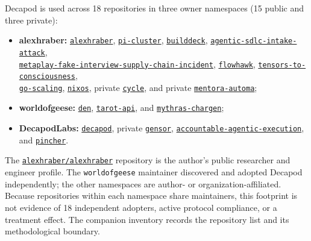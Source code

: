 Decapod is used across 18 repositories in three owner namespaces (15 public and three private):
\begin{sloppypar}
\begin{itemize}
    \item \textbf{alexhraber:} \href{https://github.com/alexhraber/alexhraber}{\nolinkurl{alexhraber}}, \href{https://github.com/alexhraber/pi-cluster}{\nolinkurl{pi-cluster}}, \href{https://github.com/alexhraber/builddeck}{\nolinkurl{builddeck}}, \href{https://github.com/alexhraber/agentic-sdlc-intake-attack}{\nolinkurl{agentic-sdlc-intake-attack}},\\
    \href{https://github.com/alexhraber/metaplay-fake-interview-supply-chain-incident}{\nolinkurl{metaplay-fake-interview-supply-chain-incident}}, \href{https://github.com/alexhraber/flowhawk}{\nolinkurl{flowhawk}}, \href{https://github.com/alexhraber/tensors-to-consciousness}{\nolinkurl{tensors-to-consciousness}},\\
    \href{https://github.com/alexhraber/go-scaling}{\nolinkurl{go-scaling}}, \href{https://github.com/alexhraber/nixos}{\nolinkurl{nixos}}, private \href{https://github.com/alexhraber/cycle}{\nolinkurl{cycle}}, and private \href{https://github.com/alexhraber/mentora-automa}{\nolinkurl{mentora-automa}};
    \item \textbf{worldofgeese:} \href{https://github.com/worldofgeese/den}{\nolinkurl{den}}, \href{https://github.com/worldofgeese/tarot-api}{\nolinkurl{tarot-api}}, and \href{https://github.com/worldofgeese/mythras-chargen}{\nolinkurl{mythras-chargen}};
    \item \textbf{DecapodLabs:} \href{https://github.com/DecapodLabs/decapod}{\nolinkurl{decapod}}, private \href{https://github.com/DecapodLabs/gensor}{\nolinkurl{gensor}}, \href{https://github.com/DecapodLabs/accountable-agentic-execution}{\nolinkurl{accountable-agentic-execution}}, and \href{https://github.com/DecapodLabs/pincher}{\nolinkurl{pincher}}.
\end{itemize}
\end{sloppypar}
The \href{https://github.com/alexhraber/alexhraber}{\nolinkurl{alexhraber/alexhraber}} repository is the author's public researcher and engineer profile. The \texttt{worldofgeese} maintainer discovered and adopted Decapod independently; the other namespaces are author- or organization-affiliated. Because repositories within each namespace share maintainers, this footprint is not evidence of 18 independent adopters, active protocol compliance, or a treatment effect. The companion inventory records the repository list and its methodological boundary.

